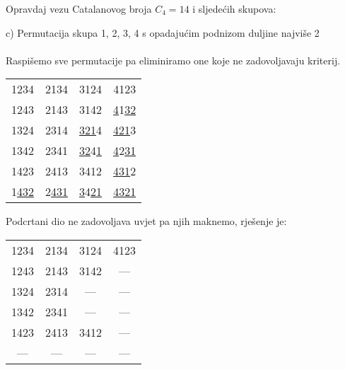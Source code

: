 \documentclass{article}
\begin{document}
	Opravdaj vezu Catalanovog broja \( C_4 = 14 \) i sljedećih skupova: 
	
	c) Permutacija skupa {1, 2, 3, 4} s opadajućim podnizom duljine najviše 2 \\ \\
	
	Raspišemo sve permutacije pa eliminiramo one koje ne zadovoljavaju kriterij.
	
	
	\begin{center}
		\begin{tabular}{ cccc } 
	 		1234 & 2134 & 3124 & 4123 \\
			1243 & 2143 & 3142 & \underline{4}1\underline{32} \\
			1324 & 2314 & \underline{321}4 & \underline{421}3 \\
			1342 & 2341 & \underline{32}4\underline{1} & \underline{4}2\underline{31} \\ 
			1423 & 2413 & 3412 & \underline{431}2 \\ 
			1\underline{432} & 2\underline{431} & \underline{3}4\underline{21} & \underline{4321}
		\end{tabular}
	\end{center}
	
	Podcrtani dio ne zadovoljava uvjet pa njih maknemo, rješenje je:
	
	\begin{center}
		\begin{tabular}{ cccc } 
	 		1234 & 2134 & 3124 & 4123 \\
			1243 & 2143 & 3142 & ---  \\
			1324 & 2314 & ---  & ---  \\
			1342 & 2341 & ---  & ---  \\ 
			1423 & 2413 & 3412 & ---  \\ 
			---  & ---  & ---  & ---
		\end{tabular}
	\end{center}
\end{document}

